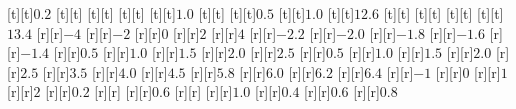 \begin{psfrags}
[t][t]{$0.2$}%
[t][t]{}%
[t][t]{}%
[t][t]{}%
[t][t]{$1.0$}%
[t][t]{}%
[t][t]{$0.5$}%
[t][t]{$1.0$}%
[t][t]{$12.6$}%
[t][t]{}%
[t][t]{}%
[t][t]{}%
[t][t]{$13.4$}%
%
[r][r]{$-4$}%
[r][r]{$-2$}%
[r][r]{$0$}%
[r][r]{$2$}%
[r][r]{$4$}%
[r][r]{$-2.2$}%
[r][r]{$-2.0$}%
[r][r]{$-1.8$}%
[r][r]{$-1.6$}%
[r][r]{$-1.4$}%
[r][r]{$0.5$}%
[r][r]{$1.0$}%
[r][r]{$1.5$}%
[r][r]{$2.0$}%
[r][r]{$2.5$}%
[r][r]{$0.5$}%
[r][r]{$1.0$}%
[r][r]{$1.5$}%
[r][r]{$2.0$}%
[r][r]{$2.5$}%
[r][r]{$3.5$}%
[r][r]{$4.0$}%
[r][r]{$4.5$}%
[r][r]{$5.8$}%
[r][r]{$6.0$}%
[r][r]{$6.2$}%
[r][r]{$6.4$}%
[r][r]{$-1$}%
[r][r]{$0$}%
[r][r]{$1$}%
[r][r]{$2$}%
[r][r]{$0.2$}%
[r][r]{}%
[r][r]{$0.6$}%
[r][r]{}%
[r][r]{$1.0$}%
[r][r]{$0.4$}%
[r][r]{$0.6$}%
[r][r]{$0.8$}%
%
%
\end{psfrags}%
%
